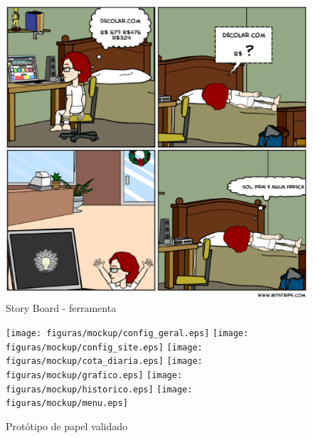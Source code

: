 \begin{figure}[h]
	\centering
	\label{fig02}
		\includegraphics[keepaspectratio=true,scale=0.5]{figuras/ferramenta.eps}
		\caption{Story Board - ferramenta}
\end{figure}

\begin{figure}[h]
	\centering
	\label{fig03}
		\texttt{[image: figuras/mockup/config\_geral.eps]}
		\texttt{[image: figuras/mockup/config\_site.eps]}
		\texttt{[image: figuras/mockup/cota\_diaria.eps]}
		\texttt{[image: figuras/mockup/grafico.eps]}
		\texttt{[image: figuras/mockup/historico.eps]}
		\texttt{[image: figuras/mockup/menu.eps]}
	\caption{Protótipo de papel validado}
\end{figure}
